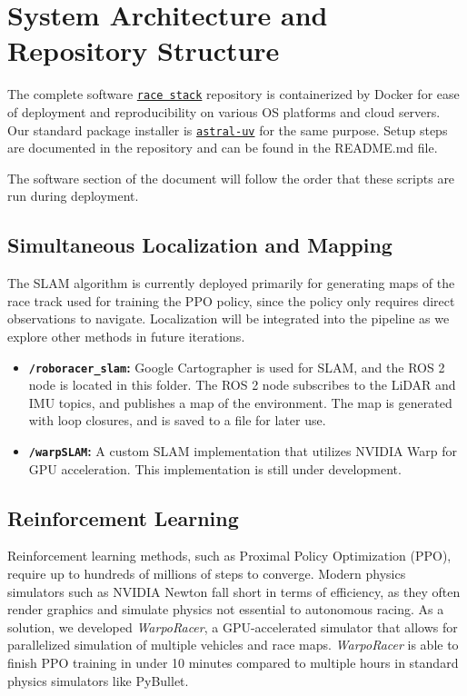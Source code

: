 \documentclass[11pt,letterpaper]{article}
\begin{document}
\section{System Architecture and Repository Structure}

The complete software \href{https://github.com/uci-f1tenth/race_stack}{\texttt{race stack}} repository is containerized by Docker for ease of deployment and reproducibility on various OS platforms and cloud servers.
Our standard package installer is \href{https://docs.astral.sh/uv/}{\texttt{astral-uv}} for the same purpose. Setup steps are documented in the repository and can be found in the README.md file.

The software section of the document will follow the order that these scripts are run during deployment.

\subsection{Simultaneous Localization and Mapping}
The SLAM algorithm is currently deployed primarily for generating maps of the race track used for training the PPO policy, since the policy only requires direct observations to navigate. 
Localization will be integrated into the pipeline as we explore other methods in future iterations.

\begin{itemize}
    \item \textbf{\texttt{/roboracer\_slam}:} Google Cartographer is used for SLAM, and the ROS 2 node is located in this folder. The ROS 2 node subscribes to the LiDAR and IMU topics, and publishes a map of the environment. The map is generated with loop closures, and is saved to a file for later use.
    \item \textbf{\texttt{/warpSLAM}:} A custom SLAM implementation that utilizes NVIDIA Warp for GPU acceleration. This implementation is still under development.
\end{itemize}

\subsection{Reinforcement Learning}
Reinforcement learning methods, such as Proximal Policy Optimization (PPO), require up to hundreds of millions of steps to converge. Modern physics simulators such as NVIDIA Newton fall short in terms of efficiency, as they often render graphics and simulate physics not essential to autonomous racing.
As a solution, we developed \textit{WarpoRacer}, a GPU-accelerated simulator that allows for parallelized simulation of multiple vehicles and race maps.
\textit{WarpoRacer} is able to finish PPO training in under 10 minutes compared to multiple hours in standard physics simulators like PyBullet.
\end{document}
